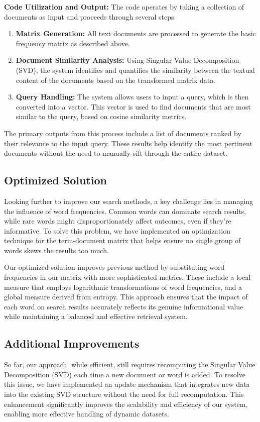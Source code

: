 \documentclass[12pt,a4paper]{article}
\begin{document}
\bigskip
\noindent \textbf{Code Utilization and Output:}
\noindent The code operates by taking a collection of documents as input and proceeds through several steps:
\begin{enumerate}
    \item \textbf{Matrix Generation:} All text documents are processed to generate the basic frequency matrix as described above.
    \item \textbf{Document Similarity Analysis:} Using Singular Value Decomposition (SVD), the system identifies and quantifies the similarity between the textual content of the documents based on the transformed matrix data.
    \item \textbf{Query Handling:} The system allows users to input a query, which is then converted into a vector. This vector is used to find documents that are most similar to the query, based on cosine similarity metrics.
\end{enumerate}
The primary outputs from this process include a list of documents ranked by their relevance to the input query. These results help identify the most pertinent documents without the need to manually sift through the entire dataset.


\subsection{Optimized Solution}

Looking further to improve our search methods, a key challenge lies in managing the influence of word frequencies. Common words can dominate search results, while rare words might disproportionately affect outcomes, even if they're informative. To solve this problem, we have implemented an optimization technique for the term-document matrix that helps ensure no single group of words skews the results too much.

\bigskip
\noindent Our optimized solution improves previous method by substituting word frequencies in our matrix with more sophisticated metrics. These include a local measure that employs logarithmic transformations of word frequencies, and a global measure derived from entropy. This approach ensures that the impact of each word on search results accurately reflects its genuine informational value while maintaining a balanced and effective retrieval system.


\subsection{Additional Improvements}
So far, our approach, while efficient, still requires recomputing the Singular Value Decomposition (SVD) each time a new document or word is added. To resolve this issue, we have implemented an update mechanism that integrates new data into the existing SVD structure without the need for full recomputation. This enhancement significantly improves the scalability and efficiency of our system, enabling more effective handling of dynamic datasets.
\end{document}
